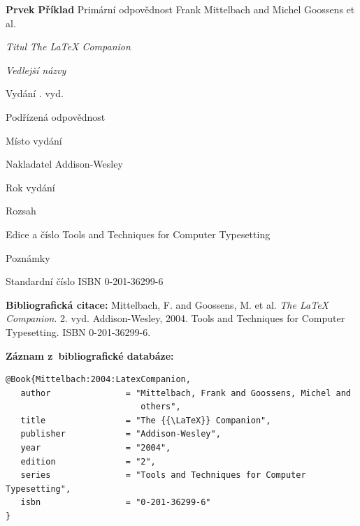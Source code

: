 
\newpage
\label{pr-monografie2}
\begin{tabbing}
\zarazky
\textbf{Prvek} \> \textbf{Příklad} \odradkovani
Primární odpovědnost \>
Frank {\sc Mittelbach} and Michel {\sc Goossens} et al.

\odradkovani
{\em Titul} \>
{\em The {\LaTeX} Companion}

\odradkovani
{\em Vedlejší názvy}\footnotemark[1]

\odradkovani
Vydání . vyd.

\odradkovani
Podřízená odpovědnost\footnotemark[1] \>

\odradkovani
Místo vydání \>

\odradkovani
Nakladatel \>
Addison-Wesley

\odradkovani
Rok vydání 

\odradkovani
Rozsah\footnotemark[1] \>

\odradkovani
Edice a číslo \>
Tools and Techniques for Computer Typesetting

\odradkovani
Poznámky\footnotemark[2] \>

\odradkovani
Standardní číslo \>
ISBN 0-201-36299-6

\odradkovani
\end{tabbing}

\noindent \textbf{Bibliografická citace:} \odradkovani
{\sc Mittelbach}, F. and {\sc Goossens}, M. et al.
{\em The {\LaTeX} Companion}. 2. vyd. Addison-Wesley, 2004.
Tools and Techniques for Computer Typesetting. ISBN 0-201-36299-6.

\bigskip \bigskip
\noindent \textbf{Záznam z~bibliografické databáze:}
\vspace{-0.5em}
\begin{verbatim}
@Book{Mittelbach:2004:LatexCompanion,
   author               = "Mittelbach, Frank and Goossens, Michel and
                           others",
   title                = "The {{\LaTeX}} Companion",
   publisher            = "Addison-Wesley",
   year                 = "2004",
   edition              = "2",
   series               = "Tools and Techniques for Computer Typesetting",
   isbn                 = "0-201-36299-6"
}
\end{verbatim}

